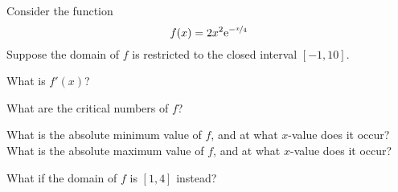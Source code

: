
Consider the function
\begin{equation*}
 f(x) = 2x^2 \mathrm{e}^{-\nicefrac{x}{4}}
\end{equation*}
Suppose the domain of $f$ is restricted to the closed interval $[-1,10]$.

\begin{ProblemSet}[pencil space=2in]
 \begin{Problem}
  What is $f'(x)$?
 \end{Problem}
 \begin{Problem}
  What are the critical numbers of $f$?
 \end{Problem}
 \begin{Problem}[pencil space=1.25in]
  What is the absolute minimum value of $f$, and at what $x$-value does it occur?
  What is the absolute maximum value of $f$, and at what $x$-value does it occur?
 \end{Problem}
 \begin{Problem}[pencil space=1.25in]
  What if the domain of $f$ is $[1,4]$ instead?
 \end{Problem}
\end{ProblemSet}

